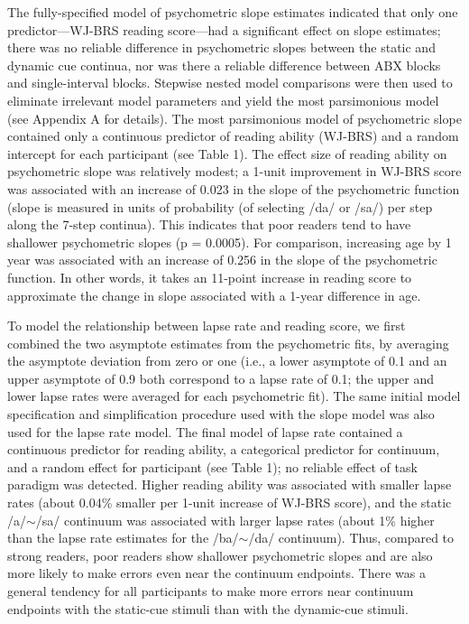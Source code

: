 \documentclass[../uwthesis.tex]{subfiles}
\begin{document}
The fully-specified model of psychometric slope estimates indicated that only one predictor—WJ-BRS reading score—had a significant effect on slope estimates; there was no reliable difference in psychometric slopes between the static and dynamic cue continua, nor was there a reliable difference between ABX blocks and single-interval blocks. Stepwise nested model comparisons were then used to eliminate irrelevant model parameters and yield the most parsimonious model (see Appendix A for details). The most parsimonious model of psychometric slope contained only a continuous predictor of reading ability (WJ-BRS) and a random intercept for each participant (see Table 1).  The effect size of reading ability on psychometric slope was relatively modest; a 1-unit improvement in WJ-BRS score was associated with an increase of 0.023 in the slope of the psychometric function (slope is measured in units of probability (of selecting /da/ or /sa/) per step along the 7-step continua). This indicates that poor readers tend to have shallower psychometric slopes (p = 0.0005). For comparison, increasing age by 1 year was associated with an increase of 0.256 in the slope of the psychometric function. In other words, it takes an 11-point increase in reading score to approximate the change in slope associated with a 1-year difference in age.

To model the relationship between lapse rate and reading score, we first combined the two asymptote estimates from the psychometric fits, by averaging the asymptote deviation from zero or one (i.e., a lower asymptote of 0.1 and an upper asymptote of 0.9 both correspond to a lapse rate of 0.1; the upper and lower lapse rates were averaged for each psychometric fit). The same initial model specification and simplification procedure used with the slope model was also used for the lapse rate model. The final model of lapse rate contained a continuous predictor for reading ability, a categorical predictor for continuum, and a random effect for participant (see Table 1); no reliable effect of task paradigm was detected. Higher reading ability was associated with smaller lapse rates (about 0.04\% smaller per 1-unit increase of WJ-BRS score), and the static /a/$\sim$/sa/ continuum was associated with larger lapse rates (about 1\% higher than the lapse rate estimates for the /ba/$\sim$/da/ continuum). Thus, compared to strong readers, poor readers show shallower psychometric slopes and are also more likely to make errors even near the continuum endpoints. There was a general tendency for all participants to make more errors near continuum endpoints with the static-cue stimuli than with the dynamic-cue stimuli. 
\end{document}
